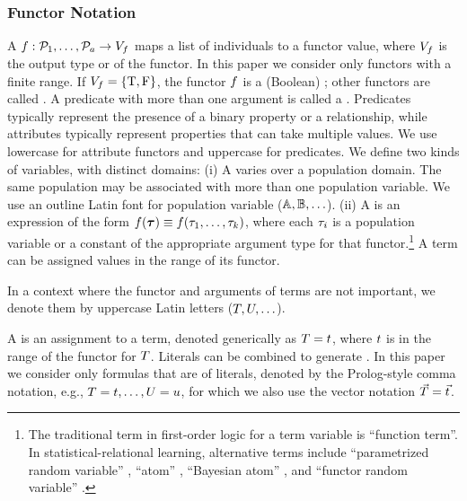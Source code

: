 \documentclass[twoside,11pt]{article}
\begin{document}
\subsubsection{Functor Notation}
A 
$
f: \mathcal{P}_{1},\ldots,\mathcal{P}_{a} \rightarrow V_{f}
$
maps a list of individuals to a functor value, 
where $V_{f}$ is the output type or  of the functor. In this paper we consider only functors with a finite range.
If $V_{f} = \{\mathrm{T},\mathrm{F}\}$, the functor $f$ is a (Boolean) ; other functors are called . A predicate with more than one argument is called a . Predicates typically represent the presence of a binary property or a relationship, while attributes typically represent properties that can take multiple values. 
We use lowercase for attribute functors and uppercase for predicates.
We define two kinds of variables, with distinct domains: (i) A  varies over a population domain. The same population may be associated with more than one population variable. We use an outline Latin font for population variable ($\mathbb{A},\mathbb{B},\ldots$).
(ii) A 
is an expression of the form $f(\boldsymbol{\tau}) \equiv f(\tau_{1},\ldots,\tau_{k})$, where 
each $\tau_{i}$ is a population variable or a constant of the appropriate argument type for that functor.\footnote{The traditional term in first-order logic for a term variable is ``function term''. In statistical-relational learning, alternative terms include ``parametrized random variable'' \cite{Poole2003}, ``atom'' \cite{Chiang2012}, ``Bayesian atom''  \cite{Kersting2007}, and ``functor random variable'' \cite{Schulte2012}.} A term can be assigned values in the range of its functor.

In a context where the functor and arguments of terms are not important, we denote them by uppercase Latin letters ($T,U,\ldots$).

A  is an assignment to a term, denoted generically as $T = t$, where $t$ is in the range of the functor for $T$. 
Literals can be combined to generate . 
In this paper we consider only formulas that are  of literals, denoted by the Prolog-style comma notation, e.g., 
$T = t, \ldots, U = u$, for which we also use the  vector notation $\vec{T} = \vec{t}\hspace{0.0ex}$.
\end{document}
